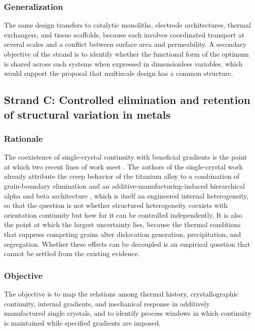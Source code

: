\documentclass[11pt]{article}
\theoremstyle{definition}
\begin{document}
\subsubsection*{Generalization}

The same design transfers to catalytic monoliths, electrode architectures, thermal exchangers, and tissue scaffolds, because each involves coordinated transport at several scales and a conflict between surface area and permeability. A secondary objective of the strand is to identify whether the functional form of the optimum is shared across such systems when expressed in dimensionless variables, which would support the proposal that multiscale design has a common structure.

\subsection{Strand C: Controlled elimination and retention of structural variation in metals}

\subsubsection*{Rationale}

The coexistence of single-crystal continuity with beneficial gradients is the point at which two recent lines of work meet \cite{liu2026,guo2025}. The authors of the single-crystal work already attribute the creep behavior of the titanium alloy to a combination of grain-boundary elimination and an additive-manufacturing-induced hierarchical alpha and beta architecture \cite{liu2026}, which is itself an engineered internal heterogeneity, so that the question is not whether structured heterogeneity coexists with orientation continuity but how far it can be controlled independently. It is also the point at which the largest uncertainty lies, because the thermal conditions that suppress competing grains alter dislocation generation, precipitation, and segregation. Whether these effects can be decoupled is an empirical question that cannot be settled from the existing evidence.

\subsubsection*{Objective}

The objective is to map the relations among thermal history, crystallographic continuity, internal gradients, and mechanical response in additively manufactured single crystals, and to identify process windows in which continuity is maintained while specified gradients are imposed.
\end{document}
